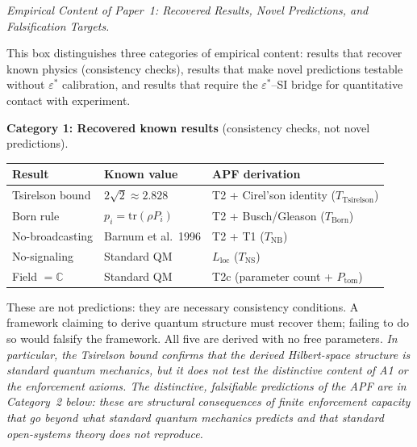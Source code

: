 \documentclass[11pt]{article}
\theoremstyle{remark}
\begin{document}
\medskip\noindent\textit{Empirical Content of Paper~1: Recovered Results, Novel Predictions, and Falsification Targets.}
\label{box:empirical_content}

This box distinguishes three categories of empirical content: results that recover known physics (consistency checks), results that make novel predictions testable without $\varepsilon^*$ calibration, and results that require the $\varepsilon^*$--SI bridge for quantitative contact with experiment.

\medskip\noindent\textbf{Category 1: Recovered known results} (consistency checks, not novel predictions).

\begin{center}
\smallskip
\begin{tabular}{@{}p{3.5cm}p{4.0cm}p{4.9cm}@{}}
\textbf{Result} & \textbf{Known value} & \textbf{APF derivation} \\[2pt]
\hline\noalign{\smallskip}
Tsirelson bound & $2\sqrt{2} \approx 2.828$ & T2 + Cirel'son identity ($T_{\mathrm{Tsirelson}}$) \\[3pt]
Born rule & $p_i = \mathrm{tr}(\rho P_i)$ & T2 + Busch/Gleason ($T_{\mathrm{Born}}$) \\[3pt]
No-broadcasting & Barnum et al.\ 1996 & T2 + T1 ($T_{\mathrm{NB}}$) \\[3pt]
No-signaling & Standard QM & $L_{\mathrm{loc}}$ ($T_{\mathrm{NS}}$) \\[3pt]
Field $= \mathbb{C}$ & Standard QM & T2c (parameter count + $P_{\mathrm{tom}}$) \\
\end{tabular}
\label{tab:empirical_cat1}
\end{center}

\smallskip\noindent These are not predictions: they are necessary consistency conditions.  A framework claiming to derive quantum structure must recover them; failing to do so would falsify the framework.  All five are derived with no free parameters.  \emph{In particular, the Tsirelson bound confirms that the derived Hilbert-space structure is standard quantum mechanics, but it does not test the distinctive content of A1 or the enforcement axioms.  The distinctive, falsifiable predictions of the APF are in Category~2 below: these are structural consequences of finite enforcement capacity that go beyond what standard quantum mechanics predicts and that standard open-systems theory does not reproduce.}
\end{document}
